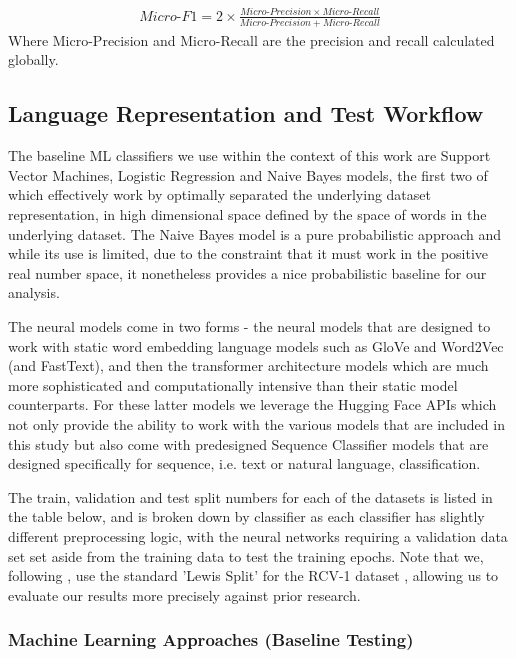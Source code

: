 \documentclass[final]{clv2025-revised}
\begin{document}
\begin{align*}
    Micro\text{-}F1=2\times \frac{Micro \text{-}Precision\times Micro\text{-}Recall}{Micro\text{-}Precision+Micro\text{-}Recall}
\end{align*}
Where Micro-Precision and Micro-Recall are the precision and recall calculated globally.


\subsection{Language Representation and Test Workflow}
The baseline ML classifiers we use within the context of this work are Support Vector Machines, Logistic Regression and Naive Bayes models, the first two of which effectively work by optimally separated the underlying dataset representation, in high dimensional space defined by the space of words in the underlying dataset. The Naive Bayes model is a pure probabilistic approach and while its use is limited, due to the constraint that it must work in the positive real number space, it nonetheless provides a nice probabilistic baseline for our analysis. 

The neural models come in two forms - the neural models that are designed to work with static word embedding language models such as GloVe and Word2Vec (and FastText), and then the transformer architecture models which are much more sophisticated and computationally intensive than their static model counterparts. For these latter models we leverage the Hugging Face APIs which not only provide the ability to work with the various models that are included in this study but also come with predesigned Sequence Classifier models that are designed specifically for sequence, i.e. text or natural language, classification.

The train, validation and test split numbers for each of the datasets is listed in the table below, and is broken down by classifier as each classifier has slightly different preprocessing logic, with the neural networks requiring a validation data set set aside from the training data to test the training epochs. Note that we, following \cite{moreo2021}, use the standard 'Lewis Split' for the RCV-1 dataset \cite{lewis2004}, allowing us to evaluate our results more precisely against prior research.


\subsubsection{Machine Learning Approaches (Baseline Testing)}
\end{document}
